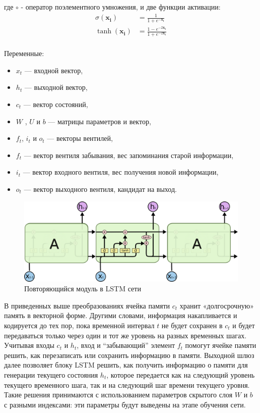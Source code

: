 где $ \circ $ - оператор поэлементного умножения, и две функции активации:
\[\begin{aligned}
 \sigma(\mathbf{x_i}) & =\frac{1}{1+e^{-\mathbf{x_i}}} \, \\
 \tanh(\mathbf{x_i}) & =\frac{1-e^{-2\mathbf{x_i}}}{1+e^{-2\mathbf{x_i}}} \\
 \end{aligned}
\]

Переменные:
\begin{itemize}
\item $ {\displaystyle x_{t}} $ — входной вектор,
\item $ {\displaystyle h_{t}}  $ — выходной вектор,
\item $ {\displaystyle c_{t}}  $ — вектор состояний,
\item $ {\displaystyle W } $ , $ {\displaystyle U }$ и $ {\displaystyle b} $ — матрицы параметров и вектор,
\item $ {\displaystyle f_{t}}  $, $ {\displaystyle i_{t}} $ и $ {\displaystyle o_{t}} $ — векторы вентилей,
\item $ {\displaystyle f_{t}}  $ — вектор вентиля забывания, вес запоминания старой информации,
\item $ {\displaystyle i_{t}}  $ — вектор входного вентиля, вес получения новой информации,
\item $ {\displaystyle o_{t}} $ — вектор выходного вентиля, кандидат на выход.
\end{itemize}
\begin{figure}[h]
	\centering
	\includegraphics[width=0.95\linewidth]{img/lstm}
	\caption{Повторяющийся модуль в LSTM сети}
	\label{fig:lstm}
\end{figure}

В приведенных выше преобразованиях ячейка памяти $ c_t $ хранит «долгосрочную» память в векторной форме. Другими словами, информация накапливается и кодируется до тех пор, пока временной интервал $ t $ не будет сохранен в $ c_t $ и будет передаваться только через один и тот же уровень на разных временных шагах.
Учитывая входы $ c_t $ и $ h_t $, вход и “забывающий” элемент $ f_t $ помогут ячейке памяти решить, как перезаписать или сохранить информацию в памяти. Выходной шлюз далее позволяет блоку LSTM решить, как получить информацию о памяти для генерации текущего состояния $ h_t $, которое передается как на следующий уровень текущего временного шага, так и на следующий шаг времени текущего уровня. Такие решения принимаются с использованием параметров скрытого слоя $ W $ и $ b $ с разными индексами: эти параметры будут выведены на этапе обучения сети.


